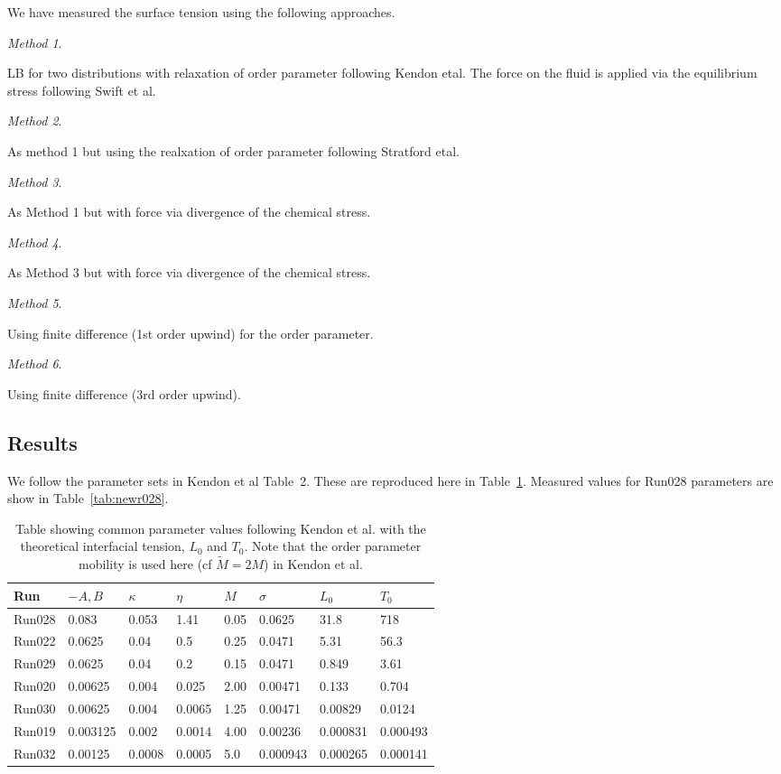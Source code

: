 We have measured the surface tension using the following approaches.

\textit{Method 1}.

LB for two distributions with relaxation of order parameter
following Kendon etal. The force on the fluid is applied
via the equilibrium stress following Swift et al.

\textit{Method 2}.

As method 1 but using the realxation of order parameter
following Stratford etal.

\textit{Method 3}.

As Method 1 but with force via divergence of the chemical stress.

\textit{Method 4}.

As Method 3 but with force via divergence of the chemical stress.

\textit{Method 5}.

Using finite difference (1st order upwind) for the order parameter.

\textit{Method 6}.

Using finite difference (3rd order upwind).

\subsection{Results}

We follow the parameter sets in Kendon et al Table~2. These
are reproduced here in Table~\ref{tab:r1}. Measured values for
Run028 parameters are show in Table~\ref{tab:newr028}.

\begin{table}
\begin{center}
\begin{tabular}{llllllll}
\hline
Run & $-A, B$ & $\kappa$ & $\eta$ & $M$ & $\sigma$  & $L_0$ & $T_0$ \\
\hline
Run028 & 0.083 & 0.053 & 1.41 & 0.05  & 0.0625 & 31.8 & 718 \\
Run022 & 0.0625 & 0.04 & 0.5 & 0.25   & 0.0471 & 5.31 & 56.3 \\
Run029 & 0.0625 & 0.04 & 0.2 & 0.15   & 0.0471 & 0.849 & 3.61 \\
Run020 & 0.00625 & 0.004 & 0.025 & 2.00 & 0.00471 & 0.133 & 0.704 \\
Run030 & 0.00625 & 0.004 & 0.0065 & 1.25 & 0.00471 & 0.00829 & 0.0124 \\
Run019 & 0.003125 & 0.002 & 0.0014 & 4.00 & 0.00236 & 0.000831 & 0.000493 \\
Run032 & 0.00125  & 0.0008 & 0.0005 & 5.0 & 0.000943 & 0.000265 & 0.000141\\
\hline  
\end{tabular}
\end{center}
\caption{Table showing common parameter values following Kendon et al.
with the theoretical interfacial tension, $L_0$ and $T_0$. Note that
the order parameter mobility is used here (cf $\tilde{M} = 2M$) in
Kendon et al.}
\label{tab:r1}
\end{table} 

